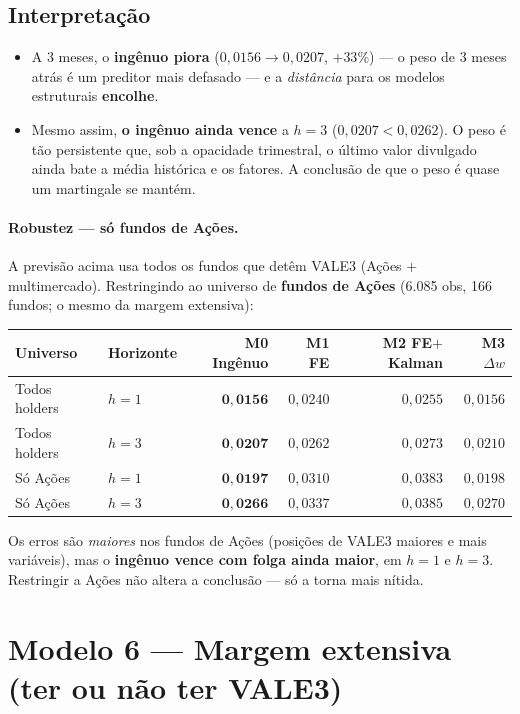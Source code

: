 \documentclass[11pt]{article}
\begin{document}
\subsection*{Interpretação}
\begin{itemize}
\item A 3 meses, o \textbf{ingênuo piora} ($0{,}0156\to0{,}0207$, $+33\%$) --- o peso de
3 meses atrás é um preditor mais defasado --- e a \emph{distância} para os modelos
estruturais \textbf{encolhe}.
\item Mesmo assim, \textbf{o ingênuo ainda vence} a $h=3$ ($0{,}0207<0{,}0262$). O peso é
tão persistente que, sob a opacidade trimestral, o último valor divulgado ainda bate a
média histórica e os fatores. A conclusão de que o peso é quase um martingale se
mantém.
\end{itemize}

\paragraph{Robustez --- só fundos de Ações.} A previsão acima usa todos os fundos que
detêm VALE3 (Ações + multimercado). Restringindo ao universo de \textbf{fundos de Ações}
(6.085 obs, 166 fundos; o mesmo da margem extensiva):

\begin{table}[h]\centering
\begin{tabular}{@{}llrrrr@{}}
\toprule
Universo & Horizonte & M0 Ingênuo & M1 FE & M2 FE$+$Kalman & M3 $\Delta w$ \\
\midrule
Todos holders & $h=1$ & $\mathbf{0{,}0156}$ & $0{,}0240$ & $0{,}0255$ & $0{,}0156$ \\
Todos holders & $h=3$ & $\mathbf{0{,}0207}$ & $0{,}0262$ & $0{,}0273$ & $0{,}0210$ \\
Só Ações      & $h=1$ & $\mathbf{0{,}0197}$ & $0{,}0310$ & $0{,}0383$ & $0{,}0198$ \\
Só Ações      & $h=3$ & $\mathbf{0{,}0266}$ & $0{,}0337$ & $0{,}0385$ & $0{,}0270$ \\
\bottomrule
\end{tabular}
\end{table}
\noindent Os erros são \emph{maiores} nos fundos de Ações (posições de VALE3 maiores e
mais variáveis), mas o \textbf{ingênuo vence com folga ainda maior}, em $h=1$ e $h=3$.
Restringir a Ações não altera a conclusão --- só a torna mais nítida.

\section{Modelo 6 — Margem extensiva (ter ou não ter VALE3)}
\end{document}
